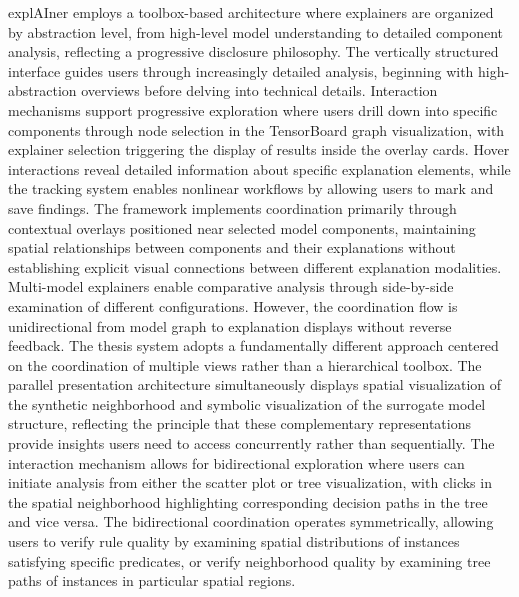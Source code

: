 explAIner \cite{8807299} employs a toolbox-based architecture where explainers are organized by abstraction level, from high-level model understanding to detailed component analysis, reflecting a progressive disclosure philosophy. The vertically structured interface guides users through increasingly detailed analysis, beginning with high-abstraction overviews before delving into technical details. Interaction mechanisms support progressive exploration where users drill down into specific components through node selection in the TensorBoard graph visualization, with explainer selection triggering the display of results inside the overlay cards. Hover interactions reveal detailed information about specific explanation elements, while the tracking system enables nonlinear workflows by allowing users to mark and save findings. The framework implements coordination primarily through contextual overlays positioned near selected model components, maintaining spatial relationships between components and their explanations without establishing explicit visual connections between different explanation modalities. Multi-model explainers enable comparative analysis through side-by-side examination of different configurations. However, the coordination flow is unidirectional from model graph to explanation displays without reverse feedback. The thesis system adopts a fundamentally different approach centered on the coordination of multiple views rather than a hierarchical toolbox. The parallel presentation architecture simultaneously displays spatial visualization of the synthetic neighborhood and symbolic visualization of the surrogate model structure, reflecting the principle that these complementary representations provide insights users need to access concurrently rather than sequentially. The interaction mechanism allows for bidirectional exploration where users can initiate analysis from either the scatter plot or tree visualization, with clicks in the spatial neighborhood highlighting corresponding decision paths in the tree and vice versa. The bidirectional coordination operates symmetrically, allowing users to verify rule quality by examining spatial distributions of instances satisfying specific predicates, or verify neighborhood quality by examining tree paths of instances in particular spatial regions. 

